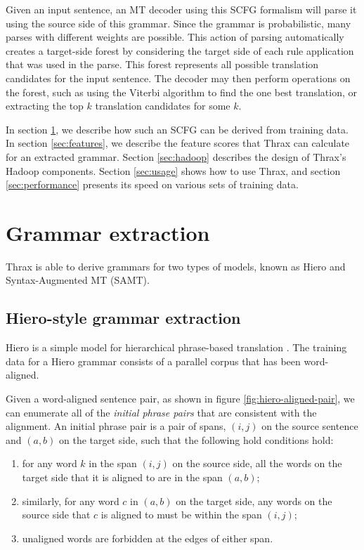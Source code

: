 \documentclass{pbml}
\begin{document}
Given an input sentence, an MT decoder using this SCFG formalism will parse it using the source side of this grammar. Since the grammar is probabilistic, many parses with different weights are possible. This action of parsing automatically creates a target-side forest by considering the target side of each rule application that was used in the parse. This forest represents all possible translation candidates for the input sentence. The decoder may then perform operations on the forest, such as using the Viterbi algorithm to find the one best translation, or extracting the top $k$ translation candidates for some $k$.

In section \ref{sec:extraction}, we describe how such an SCFG can be derived from training data. In section \ref{sec:features}, we describe the feature scores that Thrax can calculate for an extracted grammar. Section \ref{sec:hadoop} describes the design of Thrax's Hadoop components. Section \ref{sec:usage} shows how to use Thrax, and section \ref{sec:performance} presents its speed on various sets of training data.

\section{Grammar extraction}
\label{sec:extraction}
Thrax is able to derive grammars for two types of models, known as Hiero and Syntax-Augmented MT (SAMT).

\subsection{Hiero-style grammar extraction}

Hiero is a simple model for hierarchical phrase-based translation \cite{Chiang2007}. The training data for a Hiero grammar consists of a parallel corpus that has been word-aligned. 

Given a word-aligned sentence pair, as shown in figure \ref{fig:hiero-aligned-pair}, we can enumerate all of the {\em initial phrase pairs} that are consistent with the alignment. An initial phrase pair is a pair of spans, $(i,j)$ on the source sentence and $(a,b)$ on the target side, such that the following hold conditions hold:
\begin{enumerate}
\item for any word $k$ in the span $(i,j)$ on the source side, all the words on the target side that it is aligned to are in the span $(a,b)$;
\item similarly, for any word $c$ in $(a,b)$ on the target side, any words on the source side that $c$ is aligned to must be within the span $(i,j)$;
\item unaligned words are forbidden at the edges of either span.
\end{enumerate}
\end{document}
